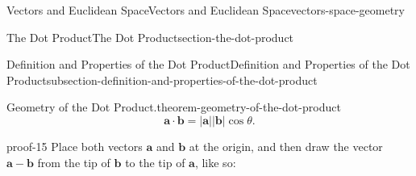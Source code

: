 \documentclass[oneside,10pt,]{book}
\numberwithin{equation}{section}
\newcommand{\vv}[1]{\mathbf{#1}}
\begin{document}
\begin{chapterptx}{Vectors and Euclidean Space}{}{Vectors and Euclidean Space}{}{}{vectors-space-geometry}
\begin{sectionptx}{The Dot Product}{}{The Dot Product}{}{}{section-the-dot-product}
\begin{subsectionptx}{Definition and Properties of the Dot Product}{}{Definition and Properties of the Dot Product}{}{}{subsection-definition-and-properties-of-the-dot-product}
\begin{theorem}{Geometry of the Dot Product.}{}{theorem-geometry-of-the-dot-product}
%
\begin{equation*}
\vv{a}\cdot\vv{b} = |\vv{a}||\vv{b}|\cos\theta.
\end{equation*}
\end{theorem}
\begin{proofptx}{}{proof-15}
\hypertarget{p-1141}{}%
Place both vectors \(\vv{a}\) and \(\vv{b}\) at the origin, and then draw the vector \(\vv{a}-\vv{b}\) from the tip of \(\vv{b}\) to the tip of \(\vv{a}\), like so:%
\begin{figure}
\centering
{
}
\end{figure}
\end{proofptx}
\end{subsectionptx}
\end{sectionptx}
\end{chapterptx}
\end{document}
